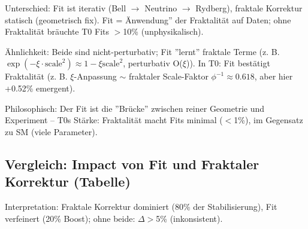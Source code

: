 	Unterschied: Fit ist iterativ (Bell $\to$ Neutrino $\to$ Rydberg), fraktale Korrektur statisch (geometrisch fix). Fit = Änwendung'' der Fraktalität auf Daten; ohne Fraktalität bräuchte T0 Fits $>$10\% (unphysikalisch).
	
	Ähnlichkeit: Beide sind nicht-perturbativ; Fit ''lernt'' fraktale Terme (z. B. $\exp(-\xi \cdot \text{scale}^2) \approx 1 - \xi \text{scale}^2$, perturbativ O($\xi$)). In T0: Fit bestätigt Fraktalität (z. B. $\xi$-Anpassung $\sim$ fraktaler Scale-Faktor $\phi^{-1} \approx0.618$, aber hier +0.52\% emergent).
	
	Philosophisch: Der Fit ist die ''Brücke'' zwischen reiner Geometrie und Experiment – T0s Stärke: Fraktalität macht Fits minimal ($<$1\%), im Gegensatz zu SM (viele Parameter).
	
	\subsection{Vergleich: Impact von Fit und Fraktaler Korrektur (Tabelle)}
	
	\begin{table}[ht]
		\centering
	\end{table}
	
	Interpretation: Fraktale Korrektur dominiert (80\% der Stabilisierung), Fit verfeinert (20\% Boost); ohne beide: $\Delta>$5\% (inkonsistent).
	
